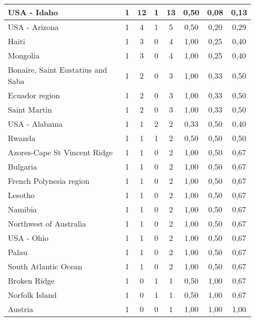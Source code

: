{\begin{table}[!ht]
\begin{tabular}{|l|ccc|c|ccc|}
USA - Idaho	 & 1 	 & 12 	 & 1 	& 13	 & 0,50 &	0,08 &	0,13 \\ \hline
USA - Arizona	 & 1 	 & 4 	 & 1 	& 5	 & 0,50 &	0,20 &	0,29 \\ \hline
Haiti	 & 1 	 & 3 	 & 0   	& 4	 & 1,00 &	0,25 &	0,40 \\ \hline
Mongolia	 & 1 	 & 3 	 & 0   	& 4	 & 1,00 &	0,25 &	0,40 \\ \hline
Bonaire, Saint Eustatius and Saba 	 & 1 	 & 2 	 & 0   	& 3	 & 1,00 &	0,33 &	0,50 \\ \hline
Ecuador region	 & 1 	 & 2 	 & 0   	& 3	 & 1,00 &	0,33 &	0,50 \\ \hline
Saint Martin	 & 1 	 & 2 	 & 0   	& 3	 & 1,00 &	0,33 &	0,50 \\ \hline
USA - Alabama	 & 1 	 & 1 	 & 2 	& 2	 & 0,33 &	0,50 &	0,40 \\ \hline
Rwanda	 & 1 	 & 1 	 & 1 	& 2	 & 0,50 &	0,50 &	0,50 \\ \hline
Azores-Cape St Vincent Ridge	 & 1 	 & 1 	 & 0   	& 2	 & 1,00 &	0,50 &	0,67 \\ \hline
Bulgaria	 & 1 	 & 1 	 & 0   	& 2	 & 1,00 &	0,50 &	0,67 \\ \hline
French Polynesia region	 & 1 	 & 1 	 & 0   	& 2	 & 1,00 &	0,50 &	0,67 \\ \hline
Lesotho	 & 1 	 & 1 	 & 0   	& 2	 & 1,00 &	0,50 &	0,67 \\ \hline
Namibia	 & 1 	 & 1 	 & 0   	& 2	 & 1,00 &	0,50 &	0,67 \\ \hline
Northwest of Australia	 & 1 	 & 1 	 & 0   	& 2	 & 1,00 &	0,50 &	0,67 \\ \hline
USA - Ohio	 & 1 	 & 1 	 & 0   	& 2	 & 1,00 &	0,50 &	0,67 \\ \hline
Palau	 & 1 	 & 1 	 & 0   	& 2	 & 1,00 &	0,50 &	0,67 \\ \hline
South Atlantic Ocean	 & 1 	 & 1 	 & 0   	& 2	 & 1,00 &	0,50 &	0,67 \\ \hline
Broken Ridge	 & 1 	 & 0   	 & 1 	& 1	 & 0,50 &	1,00 &	0,67 \\ \hline
Norfolk Island	 & 1 	 & 0   	 & 1 	& 1	 & 0,50 &	1,00 &	0,67 \\ \hline
Austria	 & 1 	 & 0   	 & 0   	& 1	 & 1,00 &	1,00 &	1,00 \\ \hline
   \end{tabular}
\end{table}}

